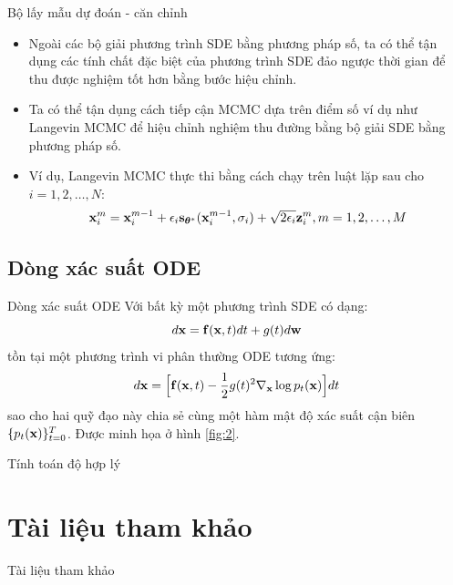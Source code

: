 \documentclass[10pt]{beamer}
\theoremstyle{remark}
\numberwithin{algocf}{section}
\numberwithin{equation}{section}
\numberwithin{dl}{section}
\numberwithin{figure}{section}
\begin{document}
\begin{frame}{Bộ lấy mẫu dự đoán - căn chỉnh}
	\begin{itemize}
		\item Ngoài các bộ giải phương trình SDE bằng phương pháp số, ta có thể tận dụng các tính chất đặc biệt của phương trình SDE đảo ngược thời gian để thu được nghiệm tốt hơn bằng bước hiệu chỉnh.
		\item Ta có thể tận dụng cách tiếp cận MCMC dựa trên điểm số ví dụ như Langevin MCMC để hiệu chỉnh nghiệm thu đường bằng bộ giải SDE bằng phương pháp số.
		\item Ví dụ, Langevin MCMC thực thi bằng cách chạy trên luật lặp sau cho $i=1,2,\dots, N$:
		\begin{equation*}
			\bold{x}_i^m = \bold{x}_i^{m-1} + \epsilon_i \bold{s}_{\boldsymbol{\theta}^{\ast}} (\bold{x}_i^{m-1}, \sigma_i) + \sqrt{2 \epsilon_i} \bold{z}_i^m, m = 1, 2, \dots, M
		\end{equation*}
	\end{itemize}
\end{frame}

\subsection{Dòng xác suất ODE}

\begin{frame}{Dòng xác suất ODE}
	Với bất kỳ một phương trình SDE có dạng:
	\begin{equation*}
		d \bold{x} = \bold{f} (\bold{x}, t) dt + g(t) d \bold{w}
	\end{equation*}
	tồn tại một phương trình vi phân thường ODE tương ứng:
	\begin{equation} \label{eq:13}
		d \bold{x} = \Big \lbrack \bold{f}(\bold{x}, t) - \dfrac{1}{2}g(t)^2 \nabla_{\bold{x}} \log p_t (\bold{x}) \Big \rbrack dt
	\end{equation}
	sao cho hai quỹ đạo này chia sẻ cùng một hàm mật độ xác suất cận biên $\lbrace p_t (\bold{x}) \rbrace_{t=0}^T$. Được minh họa ở hình \ref{fig:2}.
\end{frame}

\begin{frame}{Tính toán độ hợp lý}
	
\end{frame}

\section{Tài liệu tham khảo}
\begin{frame}[allowframebreaks]{Tài liệu tham khảo}
    \printbibliography
\end{frame}
\end{document}
